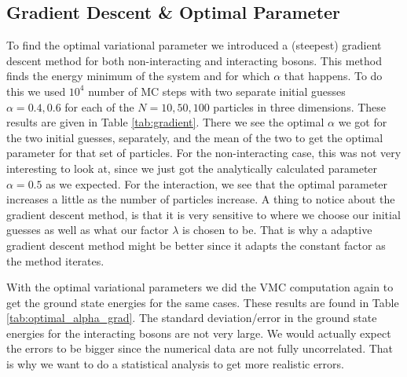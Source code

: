\documentclass[12pt,a4paper,english]{article}
\begin{document}
\subsection{Gradient Descent \& Optimal Parameter}
\label{subsect:Result_gradient}
To find the optimal variational parameter we introduced a (steepest) gradient descent method for both non-interacting and interacting bosons. This method finds the energy minimum of the system and for which $\alpha$ that happens. To do this we used $10^4$ number of MC steps with two separate initial guesses $\alpha=0.4, 0.6$ for each of the $N=10,50,100$ particles in three dimensions. These results are given in Table \ref{tab:gradient}. There we see the optimal $\alpha$ we got for the two initial guesses, separately, and the mean of the two to get the optimal parameter for that set of particles. For the non-interacting case, this was not very interesting to look at, since we just got the analytically calculated parameter $\alpha=0.5$ as we expected. For the interaction, we see that the optimal parameter increases a little as the number of particles increase. A thing to notice about the gradient descent method, is that it is very sensitive to where we choose our initial guesses as well as what our factor $\lambda$ is chosen to be. That is why a adaptive gradient descent method might be better since it adapts the constant factor as the method iterates.

With the optimal variational parameters we did the VMC computation again to get the ground state energies for the same cases. These results are found in Table \ref{tab:optimal_alpha_grad}. The standard deviation/error in the ground state energies for the interacting bosons are not very large. We would actually expect the errors to be bigger since the numerical data are not fully uncorrelated. That is why we want to do a statistical analysis to get more realistic errors.
\end{document}
